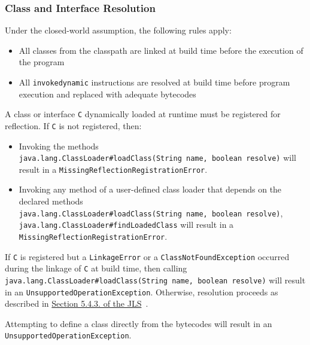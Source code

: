 \subsubsection{Class and Interface Resolution}
Under the closed-world assumption, the following rules apply: 
\begin{itemize}
    \item All classes from the classpath are linked at build time before the execution of the program  
    \item All \texttt{invokedynamic} instructions are resolved at build time before program execution and replaced with adequate bytecodes
\end{itemize}

A class or interface \verb|C| dynamically loaded at runtime must be registered for reflection. If \verb|C| is not registered, then: 
\begin{itemize}
    \item Invoking the methods \texttt{java.lang.ClassLoader\#loadClass(String\ name,\ boolean\ resolve)} will result in a \texttt{MissingReflectionRegistrationError}. 
    \item Invoking any method of a user-defined class loader that depends on the declared methods \texttt{java.lang.ClassLoader\#loadClass(String\ name,\ boolean\ resolve)}, \texttt{java.lang.ClassLoader\#findLoadedClass} will result in a \texttt{MissingReflectionRegistrationError}.
\end{itemize}

If \verb|C| is registered but a \texttt{LinkageError} or a \texttt{ClassNotFoundException} occurred during the linkage of \verb|C| at build time, then calling \texttt{java.lang.ClassLoader\#loadClass(String\ name,\ boolean\ resolve)} will result in an \texttt{UnsupportedOperationException}. Otherwise, resolution proceeds as described in \href{https://docs.oracle.com/javase/specs/jvms/se21/html/jvms-5.html\#jvms-5.4.3}{Section
5.4.3. of the JLS}~\cite{noauthor_java_nodate-2}.

Attempting to define a class directly from the bytecodes will result in an \texttt{UnsupportedOperationException}.

